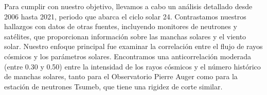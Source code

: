 {%



Para cumplir con nuestro objetivo, llevamos a cabo un análisis detallado desde 2006 hasta 2021, periodo que abarca el ciclo solar 24. Contrastamos nuestros hallazgos con datos de otras fuentes, incluyendo monitores de neutrones y satélites, que proporcionan información sobre las manchas solares y el viento solar. Nuestro enfoque principal fue examinar la correlación entre el flujo de rayos cósmicos y los parámetros solares. Encontramos una anticorrelación moderada (entre 0.30 y 0.50) entre la intensidad de los rayos cósmicos y el número histórico de manchas solares, tanto para el Observatorio Pierre Auger como para la estación de neutrones Tsumeb, que tiene una rigidez de corte similar.

}

